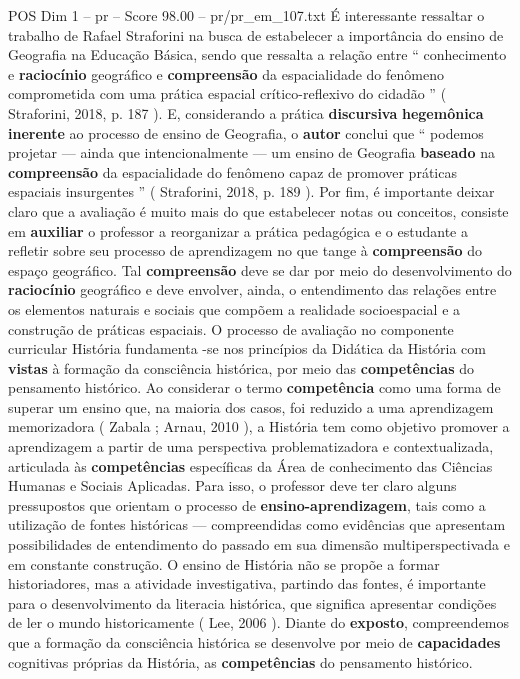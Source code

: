 \begin{textsample}{POS Dim 1 – pr – Score 98.00 – pr/pr\_em\_107.txt}
É interessante ressaltar o trabalho de Rafael Straforini na busca de estabelecer a importância do ensino de Geografia na Educação Básica, sendo que ressalta a relação entre “ conhecimento e \textbf{raciocínio} geográfico e \textbf{compreensão} da espacialidade do fenômeno comprometida com uma prática espacial crítico-reflexivo do cidadão ” ( Straforini, 2018, p. 187 ).
E, considerando a prática \textbf{discursiva} \textbf{hegemônica} \textbf{inerente} ao processo de ensino de Geografia, o \textbf{autor} conclui que “ podemos projetar — ainda que intencionalmente — um ensino de Geografia \textbf{baseado} na \textbf{compreensão} da espacialidade do fenômeno capaz de promover práticas espaciais insurgentes ” ( Straforini, 2018, p. 189 ).
Por fim, é importante deixar claro que a avaliação é muito mais do que estabelecer notas ou conceitos, consiste em \textbf{auxiliar} o professor a reorganizar a prática pedagógica e o estudante a refletir sobre seu processo de aprendizagem no que tange à \textbf{compreensão} do espaço geográfico.
Tal \textbf{compreensão} deve se dar por meio do desenvolvimento do \textbf{raciocínio} geográfico e deve envolver, ainda, o entendimento das relações entre os elementos naturais e sociais que compõem a realidade socioespacial e a construção de práticas espaciais.
O processo de avaliação no componente curricular História fundamenta -se nos princípios da Didática da História com \textbf{vistas} à formação da consciência histórica, por meio das \textbf{competências} do pensamento histórico.
Ao considerar o termo \textbf{competência} como uma forma de superar um ensino que, na maioria dos casos, foi reduzido a uma aprendizagem memorizadora ( Zabala ; Arnau, 2010 ), a História tem como objetivo promover a aprendizagem a partir de uma perspectiva problematizadora e contextualizada, articulada às \textbf{competências} específicas da Área de conhecimento das Ciências Humanas e Sociais Aplicadas.
Para isso, o professor deve ter claro alguns pressupostos que orientam o processo de \textbf{ensino-aprendizagem}, tais como a utilização de fontes históricas — compreendidas como evidências que apresentam possibilidades de entendimento do passado em sua dimensão multiperspectivada e em constante construção.
O ensino de História não se propõe a formar historiadores, mas a atividade investigativa, partindo das fontes, é importante para o desenvolvimento da literacia histórica, que significa apresentar condições de ler o mundo historicamente ( Lee, 2006 ).
Diante do \textbf{exposto}, compreendemos que a formação da consciência histórica se desenvolve por meio de \textbf{capacidades} cognitivas próprias da História, as \textbf{competências} do pensamento histórico.

\end{textsample}
